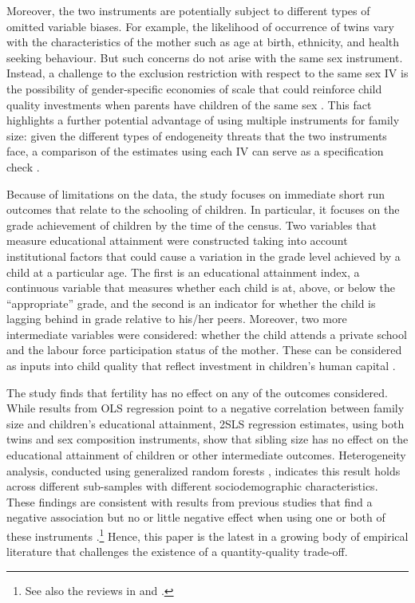 Moreover, the two instruments are potentially subject to different types of omitted variable biases. For example, the likelihood of occurrence of twins vary with the characteristics of the mother such as age at birth, ethnicity, and health seeking behaviour. But such concerns do not arise with the same sex instrument. Instead, a challenge to the exclusion restriction with respect to the same sex IV is the possibility of gender-specific economies of scale that could reinforce child quality investments when parents have children of the same sex \parencite{rosenzweig_natural_2000}. This fact highlights a further potential advantage of using multiple instruments for family size: given the different types of endogeneity threats that the two instruments face, a comparison of the estimates using each IV can serve as a specification check \parencite{angrist_multiple_2010}.

Because of limitations on the data, the study focuses on immediate short run outcomes that relate to the schooling of children. In particular, it focuses on the grade achievement of children by the time of the census. Two variables that measure educational attainment were constructed taking into account institutional factors that could cause a variation in the grade level achieved by a child at a particular age. The first is an educational attainment index, a continuous variable that measures whether each child is at, above, or below the “appropriate” grade, and the second is an indicator for whether the child is lagging behind in grade relative to his/her peers. Moreover, two more intermediate variables were considered: whether the child attends a private school and the labour force participation status of the mother. These can be considered as inputs into child quality that reflect investment in children’s human capital \parencite{caceres-delpiano_impacts_2006}.

The study finds that fertility has no effect on any of the outcomes considered. While results from OLS regression point to a negative correlation between family size and children’s educational attainment, 2SLS regression estimates, using both twins and sex composition instruments, show that sibling size has no effect on the educational attainment of children or other intermediate outcomes. Heterogeneity analysis, conducted using generalized random forests \parencite{Athey2019}, indicates this result holds across different sub-samples with different sociodemographic characteristics. These findings are consistent with results from previous studies that find a negative association but no or little negative effect when using one or both of these instruments \parencite[see, for example,][]{Black2005,Black2010,caceres-delpiano_impacts_2006,angrist_multiple_2010,Ponczek2012,bhalotra_twin_2020}.\footnote{See also the reviews in \textcite{clarke_children_2018} and \textcite{oberg_casual_2021}.} Hence, this paper is the latest in a growing body of empirical literature that challenges the existence of a quantity-quality trade-off.

